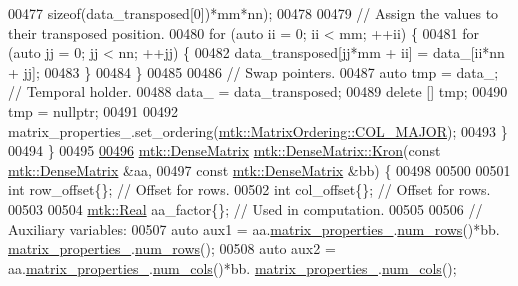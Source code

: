 \begin{DoxyCode}
00477           \textcolor{keyword}{sizeof}(data\_transposed[0])*mm*nn);
00478 
00479     \textcolor{comment}{// Assign the values to their transposed position.}
00480     \textcolor{keywordflow}{for} (\textcolor{keyword}{auto} ii = 0; ii < mm; ++ii) \{
00481       \textcolor{keywordflow}{for} (\textcolor{keyword}{auto} jj = 0; jj < nn; ++jj) \{
00482         data\_transposed[jj*mm + ii] = data\_[ii*nn + jj];
00483       \}
00484     \}
00485 
00486     \textcolor{comment}{// Swap pointers.}
00487     \textcolor{keyword}{auto} tmp = data\_; \textcolor{comment}{// Temporal holder.}
00488     data\_ = data\_transposed;
00489     \textcolor{keyword}{delete} [] tmp;
00490     tmp = \textcolor{keyword}{nullptr};
00491 
00492     matrix\_properties\_.set\_ordering(\hyperlink{namespacemtk_ga622801bd9f912d0f976c3e383f5f581ca34d2765ffc490951febdcca04bc4f7cd}{mtk::MatrixOrdering::COL\_MAJOR});
00493   \}
00494 \}
00495 
\hypertarget{mtk__dense__matrix_8cc_source_l00496}{}\hyperlink{classmtk_1_1DenseMatrix_a01d3d8bd502870f93bf3a88a0cc5fb49}{00496} \hyperlink{classmtk_1_1DenseMatrix}{mtk::DenseMatrix} \hyperlink{classmtk_1_1DenseMatrix_a01d3d8bd502870f93bf3a88a0cc5fb49}{mtk::DenseMatrix::Kron}(\textcolor{keyword}{const} 
      \hyperlink{classmtk_1_1DenseMatrix}{mtk::DenseMatrix} &aa,
00497                                         \textcolor{keyword}{const} \hyperlink{classmtk_1_1DenseMatrix}{mtk::DenseMatrix} &bb) \{
00498 
00500 
00501   \textcolor{keywordtype}{int} row\_offset\{\}; \textcolor{comment}{// Offset for rows.}
00502   \textcolor{keywordtype}{int} col\_offset\{\}; \textcolor{comment}{// Offset for rows.}
00503 
00504   \hyperlink{group__c01-roots_gac080bbbf5cbb5502c9f00405f894857d}{mtk::Real} aa\_factor\{\};    \textcolor{comment}{// Used in computation.}
00505 
00506   \textcolor{comment}{// Auxiliary variables:}
00507   \textcolor{keyword}{auto} aux1 = aa.\hyperlink{classmtk_1_1DenseMatrix_a481c8d09af685a5ba67acefdcaa810cc}{matrix\_properties\_}.\hyperlink{classmtk_1_1Matrix_ab308b25b48e4fcd39fc60e0c3fc66dea}{num\_rows}()*bb.
      \hyperlink{classmtk_1_1DenseMatrix_a481c8d09af685a5ba67acefdcaa810cc}{matrix\_properties\_}.\hyperlink{classmtk_1_1Matrix_ab308b25b48e4fcd39fc60e0c3fc66dea}{num\_rows}();
00508   \textcolor{keyword}{auto} aux2 = aa.\hyperlink{classmtk_1_1DenseMatrix_a481c8d09af685a5ba67acefdcaa810cc}{matrix\_properties\_}.\hyperlink{classmtk_1_1Matrix_a2160118d0edf51cf2aaa806ee1b915f8}{num\_cols}()*bb.
      \hyperlink{classmtk_1_1DenseMatrix_a481c8d09af685a5ba67acefdcaa810cc}{matrix\_properties\_}.\hyperlink{classmtk_1_1Matrix_a2160118d0edf51cf2aaa806ee1b915f8}{num\_cols}();

\end{DoxyCode}

